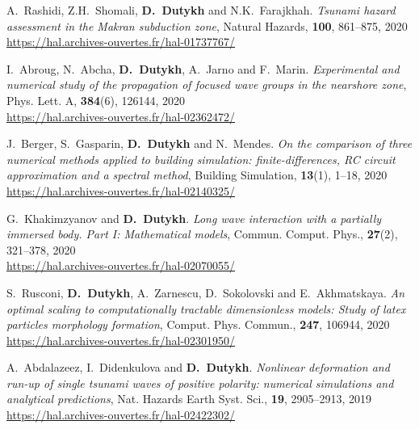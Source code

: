 \documentclass[final, a4paper, oneside, 12pt]{article}
\numberwithin{equation}{section}
\begin{document}
\begin{etaremune}
  \item A.~Rashidi, Z.H.~Shomali, \textbf{D.~Dutykh} and N.K.~Farajkhah. \textit{Tsunami hazard assessment in the Makran subduction zone}, Natural Hazards, \textbf{100}, 861--875, 2020 \\ %
  \url{https://hal.archives-ouvertes.fr/hal-01737767/}
  
  \item I.~Abroug, N.~Abcha, \textbf{D.~Dutykh}, A.~Jarno and F.~Marin. \textit{Experimental and numerical study of the propagation of focused wave groups in the nearshore zone}, Phys. Lett. A, \textbf{384}(6), 126144, 2020 \\ %
  \url{https://hal.archives-ouvertes.fr/hal-02362472/}
  
  \item J.~Berger, S.~Gasparin, \textbf{D.~Dutykh} and N.~Mendes. \textit{On the comparison of three numerical methods applied to building simulation: finite-differences, RC circuit approximation and a spectral method}, Building Simulation, \textbf{13}(1), 1--18, 2020 \\ %
  \url{https://hal.archives-ouvertes.fr/hal-02140325/}
  
  \item G.~Khakimzyanov and \textbf{D.~Dutykh}. \textit{Long wave interaction with a partially immersed body. Part I: Mathematical models}, Commun. Comput. Phys., \textbf{27}(2), 321--378, 2020 \\ %
  \url{https://hal.archives-ouvertes.fr/hal-02070055/}
  
  \item S.~Rusconi, \textbf{D.~Dutykh}, A.~Zarnescu, D.~Sokolovski and E.~Akhmatskaya. \textit{An optimal scaling to computationally tractable dimensionless models: Study of latex particles morphology formation}, Comput. Phys. Commun., \textbf{247}, 106944, 2020 \\ %
  \url{https://hal.archives-ouvertes.fr/hal-02301950/}
  
  
  \item A.~Abdalazeez, I.~Didenkulova and \textbf{D.~Dutykh}. \textit{Nonlinear deformation and run-up of single tsunami waves of positive polarity: numerical simulations and analytical predictions}, Nat. Hazards Earth Syst. Sci., \textbf{19}, 2905--2913, 2019 \\ %
  \url{https://hal.archives-ouvertes.fr/hal-02422302/}
  

\end{etaremune}
\end{document}
